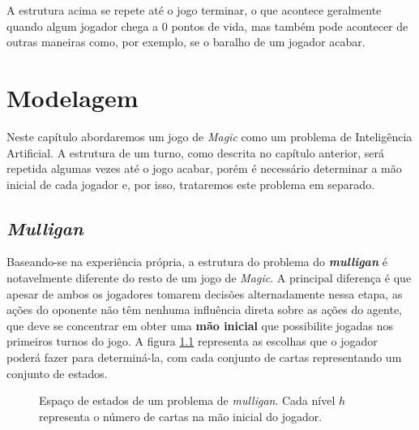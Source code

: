 \documentclass{book}
\begin{document}
A estrutura acima se repete até o jogo terminar, o que acontece
geralmente quando algum jogador chega a 0 pontos de vida,
mas também pode acontecer de outras maneiras como, por exemplo, se o
baralho de um jogador acabar.

\chapter{Modelagem}

Neste capítulo abordaremos um jogo de \textit{Magic} como um problema de
Inteligência Artificial. A estrutura de um turno, como descrita
 no capítulo anterior, será repetida algumas vezes até o jogo acabar,
porém é necessário determinar a mão inicial de cada jogador e, por isso,
 trataremos este problema em separado.

\section{\textit{Mulligan}}
Baseando-se na experiência própria, a estrutura do problema do
\textbf{\textit{mulligan}} é notavelmente diferente do resto de um jogo
de \textit{Magic}.
A principal diferença é que apesar de ambos os jogadores tomarem
decisões alternadamente nessa etapa, as ações do oponente não têm
nenhuma influência
direta sobre as ações do agente, que deve se concentrar em obter uma
\textbf{mão inicial} que possibilite jogadas nos primeiros turnos do
jogo.
A figura \ref{mulligan} representa as escolhas que o jogador poderá
fazer para determiná-la, com cada conjunto de cartas representando um
conjunto
de estados.

\begin{figure}
  \centering
  \label{mulligan}
  
  \caption{Espaço de estados de um problema de \textit{mulligan}. Cada
nível $h$ representa o número de cartas na mão inicial do jogador.}
\end{figure}
\end{document}
